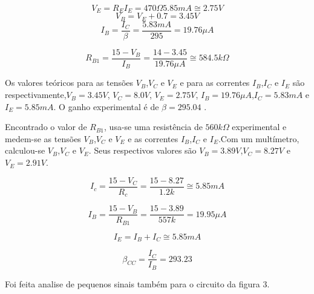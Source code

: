 \documentclass[a4paper]{article} %
\begin{document}
\begin{displaymath}
V_E=R_EI_E=470\Omega 5.85mA \cong 2.75V
\end{displaymath}
\begin{displaymath}
V_B=V_E+0.7=3.45V
\end{displaymath}
\begin{displaymath}
I_B=\frac{I_C}{\beta}=\frac{5.83mA}{295}=19.76\mu A
\end{displaymath}

\begin{displaymath}
R_{B1}=\frac{15-V_B}{I_B}=\frac{14-3.45}{19.76\mu A} \cong 584.5k\Omega 
\end{displaymath}

Os valores teóricos para as tensões $V_B$,$V_C$ e $V_E$ e para as correntes $I_B$,$I_C$ e $I_E$
são respectivamente,$V_B=3.45V$, $V_C=8.0V$, $V_E=2.75V$, $I_B=19.76 \mu A$,$I_C=5.83mA$ e $I_E=5.85mA$.
O ganho experimental é de $\beta =295.04$ . 

Encontrado o valor de $R_{B1}$, usa-se uma resistência de $560k\Omega$
experimental e medem-se as tensões $V_B$,$V_C$ e $V_E$  e as correntes $I_B$,$I_C$ e $I_E$.Com um
multímetro, calculou-se $V_B$,$V_C$ e $V_E$. Seus respectivos valores são $V_B=3.89V$,$V_C=8.27V$
e $V_E=2.91V$.


\begin{displaymath}
I_c=\frac{15-V_C}{R_c}=\frac{15-8.27}{1.2k}\cong5.85mA
\end{displaymath}


\begin{displaymath}
I_B=\frac{15-V_B}{R_{B1}}=\frac{15-3.89}{557k}=19.95\mu A
\end{displaymath}


\begin{displaymath}
I_E=I_B+I_C \cong 5.85mA
\end{displaymath}

\begin{displaymath}
\beta_{CC}=\frac{I_C}{I_B}=293.23
\end{displaymath}


Foi feita analise de pequenos sinais também para o circuito da figura 3.
\end{document}
